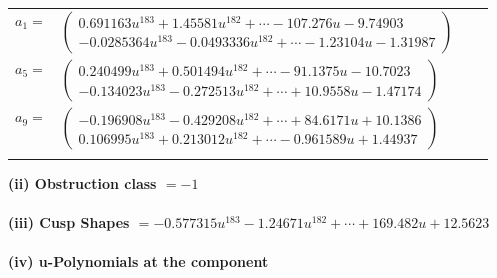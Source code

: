 \documentclass[1p]{elsarticle_modified}
\theoremstyle{definition}
\begin{document}
\begin{tabular}{m{7pt} m{180pt} m{7pt} m{180pt} }
\flushright $a_{1}=$&$\begin{pmatrix}0.691163 u^{183}+1.45581 u^{182}+\cdots-107.276 u-9.74903\\-0.0285364 u^{183}-0.0493336 u^{182}+\cdots-1.23104 u-1.31987\end{pmatrix}$ \\
\flushright $a_{5}=$&$\begin{pmatrix}0.240499 u^{183}+0.501494 u^{182}+\cdots-91.1375 u-10.7023\\-0.134023 u^{183}-0.272513 u^{182}+\cdots+10.9558 u-1.47174\end{pmatrix}$ \\
\flushright $a_{9}=$&$\begin{pmatrix}-0.196908 u^{183}-0.429208 u^{182}+\cdots+84.6171 u+10.1386\\0.106995 u^{183}+0.213012 u^{182}+\cdots-0.961589 u+1.44937\end{pmatrix}$\\&\end{tabular}
\flushleft \textbf{(ii) Obstruction class $= -1$}\\~\\
\flushleft \textbf{(iii) Cusp Shapes $= -0.577315 u^{183}-1.24671 u^{182}+\cdots+169.482 u+12.5623$}\\~\\
\newpage\renewcommand{\arraystretch}{1}
\flushleft \textbf{(iv) u-Polynomials at the component}\newline \\
\end{document}
